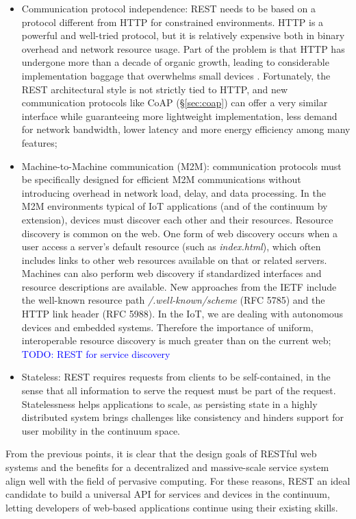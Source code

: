 \begin{itemize}
    \item Communication protocol independence: REST needs to be based on a protocol different from HTTP for constrained environments. HTTP is a powerful and well-tried protocol, but it is relatively expensive both in binary overhead and network resource usage. Part of the problem is that HTTP has undergone more than a decade of organic growth, leading to considerable implementation baggage that overwhelms small devices \cite{coap}. Fortunately, the REST architectural style is not strictly tied to HTTP, and new communication protocols like CoAP (§\ref{sec:coap}) can offer a very similar interface while guaranteeing more lightweight implementation, less demand for network bandwidth, lower latency and more energy efficiency among many features;
    \item Machine-to-Machine communication (M2M): communication protocols must be specifically designed for efficient M2M communications without introducing overhead in network load, delay, and data processing. In the M2M environments typical of IoT applications (and of the continuum by extension), devices must discover each other and their resources. Resource discovery is common on the web. One form of web discovery occurs when a user access a server's default resource (such as \emph{index.html}), which often includes links to other web resources available on that or related servers. Machines can also perform web discovery if standardized interfaces and resource descriptions are available. New approaches from the IETF include the well-known resource path \emph{/.well-known/scheme} (RFC 5785) and the HTTP link header (RFC 5988). In the IoT, we are dealing with autonomous devices and embedded systems. Therefore the importance of uniform, interoperable resource discovery is much greater than on the current web; \textcolor{blue}{TODO: REST for service discovery}
    \item Stateless: REST requires requests from clients to be self-contained, in the sense that all information to serve the request must be part of the request. Statelessness helps applications to scale, as persisting state in a highly distributed system brings challenges like consistency and hinders support for user mobility in the continuum space.
\end{itemize}

From the previous points, it is clear that the design goals of RESTful web systems and the benefits for a decentralized and massive-scale service system align well with the field of pervasive computing. For these reasons, REST an ideal candidate to build a universal API for services and devices in the continuum, letting developers of web-based applications continue using their existing skills. 

